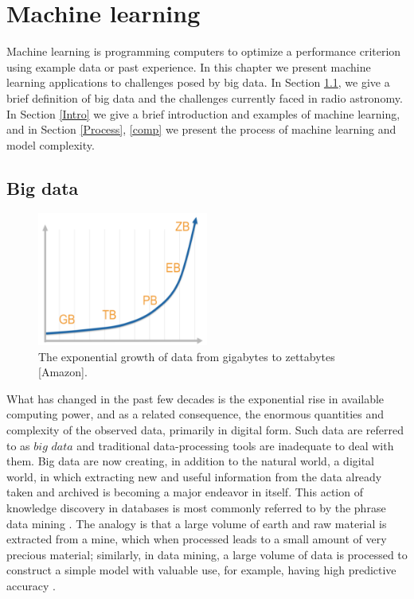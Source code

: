 
\chapter{Machine learning}
Machine learning is programming computers to optimize a performance
criterion using example data or past experience. In this chapter we present machine learning applications to challenges posed by big data. In Section \ref{BigD}, we give a brief definition of big data  and the challenges currently faced in radio astronomy. In Section \ref{Intro} we give a brief introduction and examples of machine learning,  and in Section \ref{Process}, \ref{comp} we  present the process of machine learning and model complexity.
\section{Big data}
\label{BigD}
\begin{figure}[H]
  \centering
    \includegraphics[width=0.5\textwidth]{images/Expgrowth.png}
    \caption{The exponential growth of data from gigabytes to zettabytes [Amazon].}
  \label{datagrowth.png}
\end{figure}
What has changed in the past few decades is the exponential rise in
available computing power, and as a related consequence, the enormous quantities and complexity of the observed data, primarily in digital form. Such data are referred to as $\textit{big data}$ and traditional data-processing tools are inadequate to deal with them. Big data are now creating, in addition to the natural world, a digital world, in which extracting new and useful information from the data already taken and archived is becoming a major endeavor in itself. This action of knowledge discovery in databases is most commonly referred to by the phrase data mining \citep{ball2010data}. The analogy is that a large volume of earth and raw material is extracted from a mine, which when processed leads to a small
amount of very precious material; similarly, in data mining, a large volume
of data is processed to construct a simple model with valuable use, for example, having high predictive accuracy \citep{alpaydin2014introduction}.



